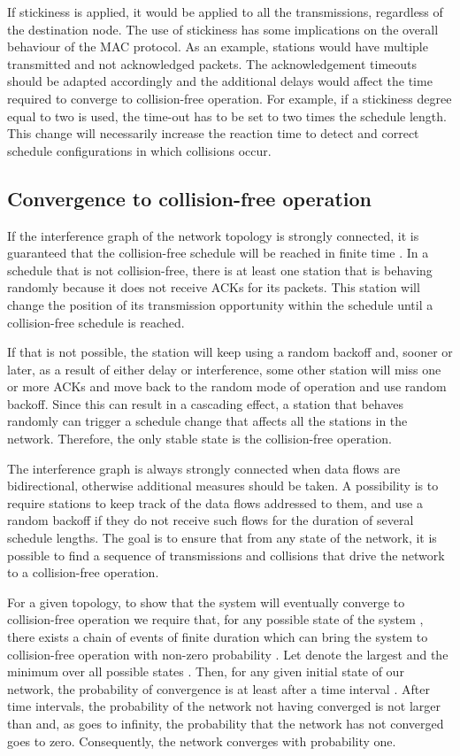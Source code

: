 \documentclass[twocolumn]{svjour3}          \smartqed  \usepackage{graphicx}
\begin{document}
If stickiness is applied, it would be applied to all the transmissions, regardless of the destination node.
The use of stickiness has some implications on the overall behaviour of the MAC protocol.
As an example, stations would have multiple transmitted and not acknowledged packets.
The acknowledgement timeouts should be adapted accordingly and the additional delays would affect the time required to converge to collision-free operation.
For example, if a stickiness degree equal to two is used, the time-out has to be set to two times the schedule length.
This change will necessarily increase the reaction time to detect and correct schedule configurations in which collisions occur.

\subsection{Convergence to collision-free operation}
If the interference graph of the network topology is strongly connected, it is guaranteed that the collision-free schedule will be reached in finite time \cite{barcelo2011cfo}.
In a schedule that is not collision-free,  there is at least one station that is behaving randomly because it does not receive ACKs for its packets.
This station will change the position of its transmission opportunity within the schedule until a collision-free schedule is reached.

If that is not possible, the station will keep using a random backoff and, sooner or later, as a result of either delay or interference, some other station will miss one or more ACKs and move back to the random mode of operation and use random backoff.
Since this can result in a cascading effect, a station that behaves randomly can trigger a schedule change that affects all the stations in the network.
Therefore, the only stable state is the collision-free operation.

The interference graph is always strongly connected  when data flows are bidirectional, otherwise additional measures should be taken.
A possibility is to require stations to keep track of the data flows addressed to them, and use a random backoff if they do not receive such flows for the duration of several schedule lengths.
The goal is to ensure that from any state of the network, it is possible to find a sequence of transmissions and collisions that drive the network to a collision-free operation.


For a given topology, to show that the system will eventually converge to collision-free operation we require that, for any possible state of the system , there exists a chain of events of finite duration  which can bring the system to collision-free operation with non-zero probability .
Let  denote the largest  and  the minimum  over all possible states .
Then, for any given initial state of our network, the probability of convergence is at least   after a time interval .
After  time intervals, the probability of the network not having converged is not larger than  and, as  goes to infinity, the probability that the network has not converged goes to zero.
Consequently, the network converges with probability one.
\end{document}
